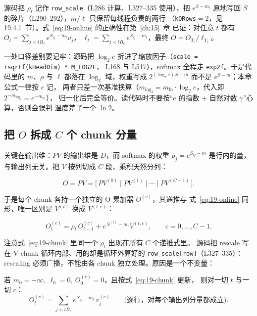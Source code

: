 源码把 $\rho_t$ 记作 \texttt{row\_scale}（L286 计算、L327--335 使用），把
$e^{S - m_t}$ 原地写回 $S$ 的碎片（L290--292），$m/\ell$ 只保留每线程负责的两行
（\texttt{kORows}$=2$，见 19.4.1~节）。式~\ref{eq:19-online} 的正确性在第~\ref{ch:15}~章
已证：对任意 $t$ 都有 $O_t = \sum_{j < t B_c} e^{S_{ij} - m_t} v_j$，
$\ell_t = \sum_{j<tB_c} e^{S_{ij}-m_t}$，最终 $O = O_{T_c}/\ell_{T_c}$。

一处口径差别要记牢：源码把 $\log_2 e$ 折进了缩放因子（\texttt{scale = rsqrtf(kHeadDim) * M\_LOG2E}，
L168 与 L517），softmax 全程走 \texttt{exp2f}。于是代码里的 $m$、$\rho$ 与 $\ell$ 都落在
$\log_2$ 域，权重写成 $2^{(\log_2 e)\,S - m}$ 而不是 $e^{S-m}$；本章公式一律按 $e$ 记，
两者只差一次基准换算（$m_{\log_2} = m_{\ln}\cdot\log_2 e$，代入即 $2^{-m_{\log_2}} = e^{-m_{\ln}}$），
归一化后完全等价。读代码时不要按“$e$ 的指数 + 自然对数 $\gamma$”心算，否则会误判
温度差了一个 $\ln 2$。

\subsection{把 $O$ 拆成 $C$ 个 chunk 分量}

关键在输出维：$PV$ 的输出维是 $D$，而 softmax 的权重 $p_j = e^{S_{ij}-m}$
是行内的量，与输出列无关。把 $V$ 按列切成 $C$ 段，乘积天然分列：

\begin{equation}
  O = P V = \bigl[\, P V^{(0)} \mid P V^{(1)} \mid \cdots \mid P V^{(C-1)} \,\bigr] .
  \label{eq:19-direct-sum}
\end{equation}

于是每个 chunk 各持一个独立的 O 累加器 $O^{(c)}$，其递推与
式~\ref{eq:19-online} 同形，唯一区别是 $V^{(t)}$ 换成 $V^{(t,c)}$：

\begin{equation}
  O^{(c)}_t = \rho_t\, O^{(c)}_{t-1} + e^{\,S^{(t)} - m_t} V^{(t,c)} ,
  \qquad c = 0,\dots,C-1 .
  \label{eq:19-chunk}
\end{equation}

注意式~\ref{eq:19-chunk} 里同一个 $\rho_t$ 出现在所有 $C$ 个递推式里。
源码把 rescale 写在 V-chunk 循环内部、用的却是循环外算好的
\texttt{row\_\allowbreak{}scale[row]}（L327--335）：rescaling 必须广播，不能由各 chunk
独立处理。原因是一个不变量：

\begin{theorem}\label{thm:19-invariant}
  若 $m_0 = -\infty,\ \ell_0 = 0,\ O^{(c)}_0 = 0$，且按式~\ref{eq:19-chunk} 更新，
  则对一切 $t$ 与一切 $c$：
  \begin{equation}
    O^{(c)}_t = \sum_{j < t B_c} e^{\,S_{ij} - m_t}\, v^{(c)}_j
    \qquad\text{(逐行，对每个输出列分量都成立)} .
    \label{eq:19-invariant}
  \end{equation}
\end{theorem}

